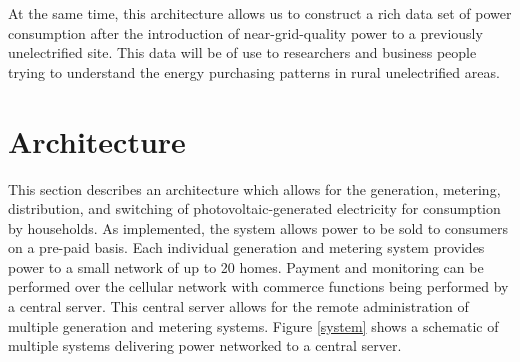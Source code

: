 \documentclass[conference]{IEEEtran}
\begin{document}
At the same time, this architecture allows us to construct
a rich data set of
power consumption after the introduction of near-grid-quality
power to a previously unelectrified site.
This data will be of use to researchers and business people
trying to understand the energy purchasing patterns in rural
unelectrified areas.


\section{Architecture}

This section describes an architecture which allows for the generation,
metering, distribution, and switching of photovoltaic-generated electricity for
consumption by households.
As implemented, the system allows power to be sold to consumers on a
pre-paid basis.
Each individual generation and metering system provides power to a small
network of up to 20 homes.
Payment and monitoring can be performed over the cellular network with commerce
functions being performed by a central server.
This central server allows for the remote administration of multiple generation
and metering systems.
Figure \ref{system} shows a schematic of multiple systems delivering power
networked to a central server.
\end{document}
